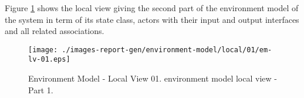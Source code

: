 
Figure \ref{fig:lu.uni.lassy.icrash.spec.messir.reference-EM-view-local-01} 
shows the local view giving the second part of the environment model of the system in term of its state class, actors with their input and output interfaces and all related associations.


\begin{figure}[htbp] 
\label{fig:lu.uni.lassy.icrash.spec.messir.reference-EM}
\begin{center}
\texttt{[image: ./images-report-gen/environment-model/local/01/em-lv-01.eps]}
\end{center}
\caption[Environment Model - Local View 01 - environment model local view - Part ]{Environment Model - Local View 01. environment model local view - Part 1.}
\label{fig:lu.uni.lassy.icrash.spec.messir.reference-EM-view-local-01}
\end{figure}
\vspace{0.5cm} 

